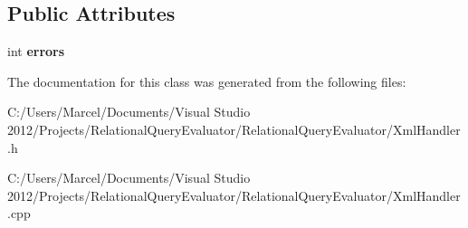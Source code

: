 \subsection*{Public Attributes}
\begin{DoxyCompactItemize}
\item 
\hypertarget{class_parser_error_handler_a1929eecf90414ca41886580f1d61248f}{int {\bfseries errors}}\label{class_parser_error_handler_a1929eecf90414ca41886580f1d61248f}

\end{DoxyCompactItemize}


The documentation for this class was generated from the following files\+:\begin{DoxyCompactItemize}
\item 
C\+:/\+Users/\+Marcel/\+Documents/\+Visual Studio 2012/\+Projects/\+Relational\+Query\+Evaluator/\+Relational\+Query\+Evaluator/Xml\+Handler.\+h\item 
C\+:/\+Users/\+Marcel/\+Documents/\+Visual Studio 2012/\+Projects/\+Relational\+Query\+Evaluator/\+Relational\+Query\+Evaluator/Xml\+Handler.\+cpp\end{DoxyCompactItemize}
